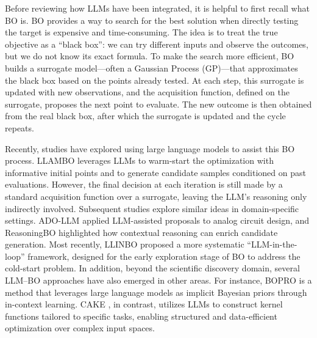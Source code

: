 \documentclass{article} %
\begin{document}
Before reviewing how LLMs have been integrated, it is helpful to first recall what BO is. BO provides a way to search for the best solution when directly testing the target is expensive and time-consuming. The idea is to treat the true objective as a “black box”: we can try different inputs and observe the outcomes, but we do not know its exact formula. To make the search more efficient, BO builds a surrogate model—often a Gaussian Process (GP)—that approximates the black box based on the points already tested. At each step, this surrogate is updated with new observations, and the acquisition function, defined on the surrogate, proposes the next point to evaluate. The new outcome is then obtained from the real black box, after which the surrogate is updated and the cycle repeats. 

Recently, studies have explored using large language models to assist this BO process. LLAMBO \citep{liularge} leverages LLMs to warm-start the optimization with informative initial points and to generate candidate samples conditioned on past evaluations. However, the final decision at
each iteration is still made by a standard acquisition function over a surrogate, leaving the LLM’s
reasoning only indirectly involved. Subsequent studies explore similar ideas in domain-specific settings. ADO-LLM \citep{ADO-LLM} applied LLM-assisted proposals to analog circuit design, and ReasoningBO \citep{ReasoningBO} highlighted how contextual reasoning can enrich candidate generation. Most recently, LLINBO \citep{LLINBO} proposed a more systematic “LLM-in-the-loop” framework, designed for the early exploration stage of BO to address the cold-start problem. In addition, beyond the scientific discovery domain, several LLM–BO approaches have also emerged in other areas. For instance, BOPRO \citep{BOPRO} is a method that leverages large language models as implicit Bayesian priors through in-context learning. CAKE \citep{CAKE}, in contrast, utilizes LLMs to construct kernel functions tailored to specific tasks, enabling structured and data-efficient optimization over complex input spaces.

\end{document}

